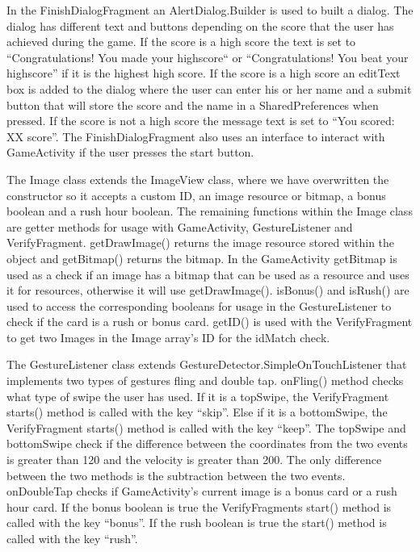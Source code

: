In the FinishDialogFragment an AlertDialog.Builder is used to built a dialog. The dialog has different text and buttons depending on the score that the user has achieved during the game. If the score is a high score the text is set to “Congratulations! You made your highscore“ or “Congratulations! You beat your highscore” if it is the highest high score. If the score is a high score an editText box is added to the dialog where the user can enter his or her name and a submit button that will store the score and the name in a SharedPreferences when pressed. If the score is not a high score the message text is set to “You scored: XX score”.
The FinishDialogFragment also uses an interface to interact with GameActivity if the user presses the start button. \newline

The Image class extends the ImageView class, where we have overwritten the constructor so it accepts a custom ID, an image resource or bitmap, a bonus boolean and a rush hour boolean. The remaining functions within the Image class are getter methods for usage with GameActivity, GestureListener and VerifyFragment. getDrawImage() returns the image resource stored within the object and getBitmap() returns the bitmap. In the GameActivity getBitmap is used as a check if an image has a bitmap that can be used as a resource and uses it for resources, otherwise it will use getDrawImage(). isBonus() and isRush() are used to access the corresponding booleans for usage in the GestureListener to check if the card is a rush or bonus card. getID() is used with the VerifyFragment to get two Images in the Image array’s ID for the idMatch check. \newline

The GestureListener class extends GestureDetector.SimpleOnTouchListener that implements two types of gestures fling and double tap. onFling() method checks what type of swipe the user has used. If it is a topSwipe, the VerifyFragment starts() method is called with the key “skip”. Else if it is a bottomSwipe, the VerifyFragment starts() method is called with the key “keep”. The topSwipe and bottomSwipe check if the difference between the coordinates from the two events is greater than 120 and the velocity is greater than 200. The only difference between the two methods is the subtraction between the two events. onDoubleTap checks if GameActivity’s current image is a bonus card or a rush hour card. If the bonus boolean is true the VerifyFragments start() method is called with the key “bonus”. If the rush boolean is true the start() method is called with the key “rush”. \newline

